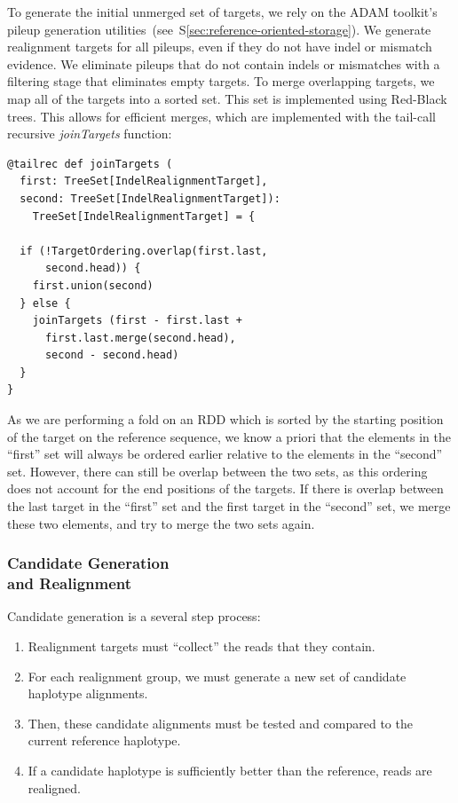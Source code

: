 \documentclass[10pt,twocolumn]{article}
\theoremstyle{plain}
\begin{document}
To generate the initial unmerged set of targets, we rely on the ADAM toolkit's pileup generation utilities~(see~\-S\ref{sec:reference-oriented-storage}).
We generate realignment targets for all pileups, even if they do not have indel or mismatch evidence. We eliminate pileups that do not contain indels
or mismatches with a filtering stage that eliminates empty targets. To merge overlapping targets, we map all of the targets into a sorted set. This set
is implemented using Red-Black trees. This allows for efficient merges, which are implemented with the tail-call recursive \emph{joinTargets} function:

\begin{lstlisting}
@tailrec def joinTargets (                                                                                                                                                               
  first: TreeSet[IndelRealignmentTarget],                                                                                                                                                                
  second: TreeSet[IndelRealignmentTarget]):
    TreeSet[IndelRealignmentTarget] = {

  if (!TargetOrdering.overlap(first.last,
      second.head)) {
    first.union(second)
  } else {
    joinTargets (first - first.last +
      first.last.merge(second.head),
      second - second.head)
  }
}
\end{lstlisting}

As we are performing a fold on an RDD which is sorted by the starting position of the target on the reference sequence, we know a priori that the elements
in the ``first'' set will always be ordered earlier relative to the elements in the ``second'' set. However, there can still be overlap between the two sets, as this
ordering does not account for the end positions of the targets. If there is overlap between the last target in the ``first'' set and the first target in the ``second''
set, we merge these two elements, and try to merge the two sets again.

\subsubsection{Candidate Generation\\and Realignment}
\label{sec:candidate-generation-realignment}

Candidate generation is a several step process:

\begin{enumerate}
\item Realignment targets must ``collect'' the reads that they contain.
\item For each realignment group, we must generate a new set of candidate haplotype alignments.
\item Then, these candidate alignments must be tested and compared to the current reference haplotype.
\item If a candidate haplotype is sufficiently better than the reference, reads are realigned.
\end{enumerate}
\end{document}
